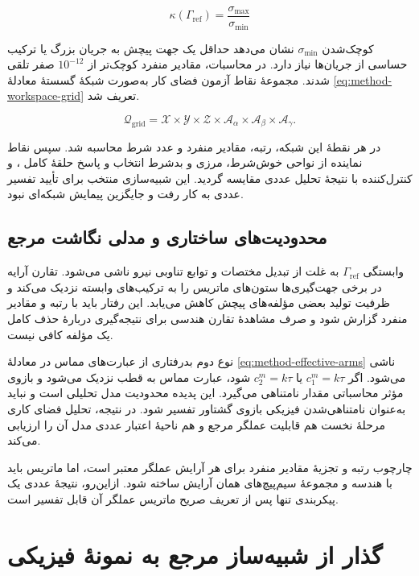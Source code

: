 \begin{equation}
	\kappa(\Gamma_{\mathrm{ref}})=\frac{\sigma_{\max}}{\sigma_{\min}}
	\label{eq:method-condition-number}
\end{equation}

کوچک‌شدن $\sigma_{\min}$ نشان می‌دهد حداقل یک جهت پیچش به جریان بزرگ یا ترکیب حساسی از جریان‌ها نیاز دارد. در محاسبات، مقادیر منفرد کوچک‌تر از $10^{-12}$ صفر تلقی شدند. مجموعهٔ نقاط آزمون فضای کار به‌صورت شبکهٔ گسستهٔ معادلهٔ \ref{eq:method-workspace-grid} تعریف شد.

\begin{equation}
	\mathcal Q_{\mathrm{grid}}=\mathcal X\times\mathcal Y\times\mathcal Z
	\times\mathcal A_{\alpha}\times\mathcal A_{\beta}\times\mathcal A_{\gamma}.
	\label{eq:method-workspace-grid}
\end{equation}

در هر نقطهٔ این شبکه، رتبه، مقادیر منفرد و عدد شرط محاسبه شد. سپس نقاط نماینده از نواحی خوش‌شرط، مرزی و بدشرط انتخاب و پاسخ حلقهٔ کامل ،  و کنترل‌کننده با نتیجهٔ تحلیل عددی مقایسه گردید. این شبیه‌سازی منتخب برای تأیید تفسیر عددی به کار رفت و جایگزین پیمایش شبکه‌ای نبود.

\subsection{محدودیت‌های ساختاری و مدلی نگاشت مرجع}

وابستگی $\Gamma_{\mathrm{ref}}$ به غلت از تبدیل مختصات و توابع تناوبی نیرو ناشی می‌شود. تقارن آرایه در برخی جهت‌گیری‌ها ستون‌های ماتریس را به ترکیب‌های وابسته نزدیک می‌کند و ظرفیت تولید بعضی مؤلفه‌های پیچش کاهش می‌یابد. این رفتار باید با رتبه و مقادیر منفرد گزارش شود و صرف مشاهدهٔ تقارن هندسی برای نتیجه‌گیری دربارهٔ حذف کامل یک مؤلفه کافی نیست.

نوع دوم بدرفتاری از عبارت‌های مماس در معادلهٔ \ref{eq:method-effective-arms} ناشی می‌شود. اگر $c_1^m=k\tau$ یا $c_2^m=k\tau$ شود، عبارت مماس به قطب نزدیک می‌شود و بازوی مؤثر محاسباتی مقدار نامتناهی می‌گیرد. این پدیده محدودیت مدل تحلیلی است و نباید به‌عنوان نامتناهی‌شدن فیزیکی بازوی گشتاور تفسیر شود. در نتیجه، تحلیل فضای کاری مرحلهٔ نخست هم قابلیت عملگر مرجع و هم ناحیهٔ اعتبار عددی مدل آن را ارزیابی می‌کند.

چارچوب رتبه و تجزیهٔ مقادیر منفرد برای هر آرایش عملگر معتبر است، اما ماتریس باید با هندسه و مجموعهٔ سیم‌پیچ‌های همان آرایش ساخته شود. ازاین‌رو، نتیجهٔ عددی یک پیکربندی تنها پس از تعریف صریح ماتریس عملگر آن قابل تفسیر است.

\section{گذار از شبیه‌ساز مرجع به نمونهٔ فیزیکی}
\label{sec:method-transition-hardware}

